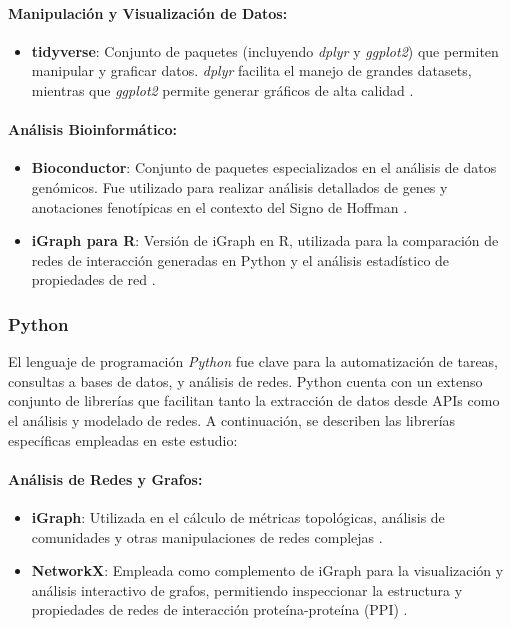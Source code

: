\paragraph{Manipulación y Visualización de Datos:}
\begin{itemize}
	\item \textbf{tidyverse}: Conjunto de paquetes (incluyendo \textit{dplyr} y \textit{ggplot2}) que permiten manipular y graficar datos. \textit{dplyr} facilita el manejo de grandes datasets, mientras que \textit{ggplot2} permite generar gráficos de alta calidad \cite{Wickham2019}.
\end{itemize}

\paragraph{Análisis Bioinformático:}
\begin{itemize}
	\item \textbf{Bioconductor}: Conjunto de paquetes especializados en el análisis de datos genómicos. Fue utilizado para realizar análisis detallados de genes y anotaciones fenotípicas en el contexto del Signo de Hoffman \cite{Huber2015}.
	\item \textbf{iGraph para R}: Versión de iGraph en R, utilizada para la comparación de redes de interacción generadas en Python y el análisis estadístico de propiedades de red \cite{Csardi2006}.
\end{itemize}


\subsubsection{Python}
El lenguaje de programación \textit{Python} fue clave para la automatización de tareas, consultas a bases de datos, y análisis de redes. Python cuenta con un extenso conjunto de librerías que facilitan tanto la extracción de datos desde APIs como el análisis y modelado de redes. A continuación, se describen las librerías específicas empleadas en este estudio:

\paragraph{Análisis de Redes y Grafos:}
\begin{itemize}
	\item \textbf{iGraph}: Utilizada en el cálculo de métricas topológicas, análisis de comunidades y otras manipulaciones de redes complejas \cite{igraph2006}.
	\item \textbf{NetworkX}: Empleada como complemento de iGraph para la visualización y análisis interactivo de grafos, permitiendo inspeccionar la estructura y propiedades de redes de interacción proteína-proteína (PPI) \cite{hagberg2008}.
\end{itemize}

